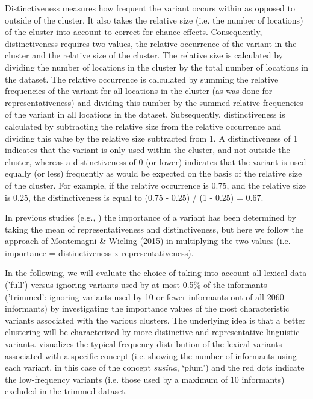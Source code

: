 \documentclass[output=paper]{LSP/langsci}
\begin{document}
Distinctiveness measures how frequent the variant occurs within as opposed to outside of the cluster. It also takes the relative size (i.e. the number of locations) of the cluster into account to correct for chance effects. Consequently, distinctiveness requires two values, the relative occurrence of the variant in the cluster and the relative size of the cluster. The relative size is calculated by dividing the number of locations in the cluster by the total number of locations in the dataset. The relative occurrence is calculated by summing the relative frequencies of the variant for all locations in the cluster (as was done for representativeness) and dividing this number by the summed relative frequencies of the variant in all locations in the dataset. Subsequently, distinctiveness is calculated by subtracting the relative size from the relative occurrence and dividing this value by the relative size subtracted from 1. A distinctiveness of 1 indicates that the variant is only used within the cluster, and not outside the cluster, whereas a distinctiveness of 0 (or lower) indicates that the variant is used equally (or less) frequently as would be expected on the basis of the relative size of the cluster. For example, if the relative occurrence is 0.75, and the relative size is 0.25, the distinctiveness is equal to (0.75 - 0.25) / (1 - 0.25) = 0.67. 

In previous studies (e.g., \citealt{wieling_analyzing_2014}) the importance of a variant has been determined by taking the mean of representativeness and distinctiveness, but here we follow the approach of Montemagni \& Wieling (2015) in multiplying the two values (i.e. importance = distinctiveness x representativeness).

In the following, we will evaluate the choice of taking into account all lexical data ('full') versus ignoring variants used by at most 0.5\% of the informants ('trimmed': ignoring variants used by 10 or fewer informants out of all 2060 informants) by investigating the importance values of the most characteristic variants associated with the various clusters. The underlying idea is that a better clustering will be characterized by more distinctive and representative linguistic variants.  visualizes the typical frequency distribution of the lexical variants associated with a specific concept (i.e. showing the number of informants using each variant, in this case of the concept \textit{susina}, `plum') and the red dots indicate the low-frequency variants (i.e. those used by a maximum of 10 informants) excluded in the trimmed dataset.
\end{document}

